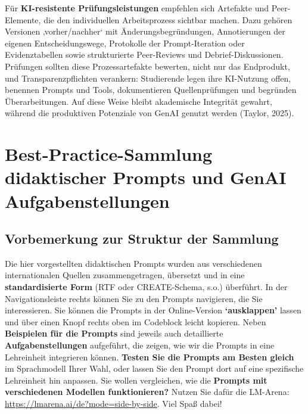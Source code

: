 \documentclass[
  ngerman,
  letterpaper,
  DIV=11]{scrreprt}
\begin{document}
Für \textbf{KI-resistente Prüfungsleistungen} empfehlen sich Artefakte
und Peer-Elemente, die den individuellen Arbeitsprozess sichtbar machen.
Dazu gehören Versionen ‚vorher/nachher` mit Änderungsbegründungen,
Annotierungen der eigenen Entscheidungswege, Protokolle der
Prompt-Iteration oder Evidenztabellen sowie strukturierte Peer-Reviews
und Debrief-Diskussionen. Prüfungen sollten diese Prozessartefakte
bewerten, nicht nur das Endprodukt, und Transparenzpflichten verankern:
Studierende legen ihre KI-Nutzung offen, benennen Prompts und Tools,
dokumentieren Quellenprüfungen und begründen Überarbeitungen. Auf diese
Weise bleibt akademische Integrität gewahrt, während die produktiven
Potenziale von GenAI genutzt werden (Taylor, 2025).

\chapter{Best-Practice-Sammlung didaktischer Prompts und GenAI
Aufgabenstellungen}\label{best-practice-sammlung-didaktischer-prompts-und-genai-aufgabenstellungen}

\section*{Vorbemerkung zur Struktur der
Sammlung}\label{vorbemerkung-zur-struktur-der-sammlung}


Die hier vorgestellten didaktischen Prompts wurden aus verschiedenen
internationalen Quellen zusammengetragen, übersetzt und in eine
\textbf{standardisierte Form} (RTF oder CREATE-Schema, s.o.) überführt.
In der Navigationsleiste rechts können Sie zu den Prompts navigieren,
die Sie interessieren. Sie können die Prompts in der Online-Version
\textbf{`ausklappen'} lassen und über einen Knopf rechts oben im
Codeblock leicht kopieren. Neben \textbf{Beispielen für die Prompts}
sind jeweils auch detaillierte \textbf{Aufgabenstellungen} aufgeführt,
die zeigen, wie wir die Prompts in eine Lehreinheit integrieren können.
\textbf{Testen Sie die Prompts am Besten gleich} im Sprachmodell Ihrer
Wahl, oder lassen Sie den Prompt dort auf eine spezifische Lehreinheit
hin anpassen. Sie wollen vergleichen, wie die \textbf{Prompts mit
verschiedenen Modellen funktionieren?} Nutzen Sie dafür die LM-Arena:
\url{https://lmarena.ai/de?mode=side-by-side}. Viel Spaß dabei!
\end{document}
